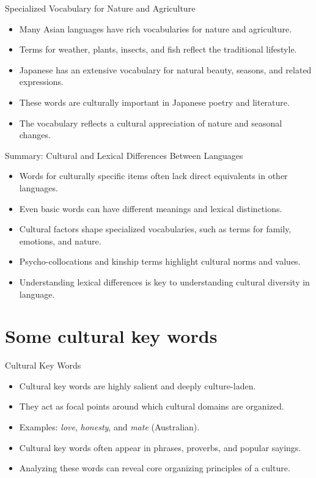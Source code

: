 \documentclass{beamer}
\begin{document}
\begin{frame}{Specialized Vocabulary for Nature and Agriculture}
    \begin{itemize}
        \item Many Asian languages have rich vocabularies for nature and agriculture.
        \item Terms for weather, plants, insects, and fish reflect the traditional lifestyle.
        \item Japanese has an extensive vocabulary for natural beauty, seasons, and related expressions.
        \item These words are culturally important in Japanese poetry and literature.
        \item The vocabulary reflects a cultural appreciation of nature and seasonal changes.
    \end{itemize}
\end{frame}

\begin{frame}{Summary: Cultural and Lexical Differences Between Languages}
    \begin{itemize}
        \item Words for culturally specific items often lack direct equivalents in other languages.
        \item Even basic words can have different meanings and lexical distinctions.
        \item Cultural factors shape specialized vocabularies, such as terms for family, emotions, and nature.
        \item Psycho-collocations and kinship terms highlight cultural norms and values.
        \item Understanding lexical differences is key to understanding cultural diversity in language.
    \end{itemize}
\end{frame}


\section{Some cultural key words}

\begin{frame}{Cultural Key Words}
    \begin{itemize}
        \item Cultural key words are highly salient and deeply culture-laden.
        \item They act as focal points around which cultural domains are organized.
        \item Examples: \textit{love}, \textit{honesty}, and \textit{mate} (Australian).
        \item Cultural key words often appear in phrases, proverbs, and popular sayings.
        \item Analyzing these words can reveal core organizing principles of a culture.
    \end{itemize}
\end{frame}
\end{document}
